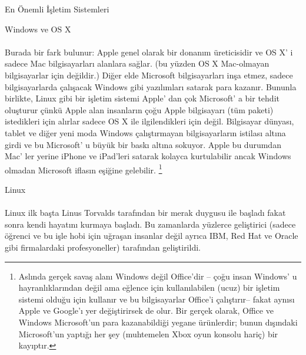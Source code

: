 \documentclass[10pt,a5paper]{book}
\begin{document}
\begin{section}{En Önemli İşletim Sistemleri}
\begin{subsection}{Windows ve OS X}
\paragraph{}{Burada bir fark bulunur: Apple genel olarak bir donanım üreticisidir ve OS X' i sadece Mac bilgisayarları alanlara sağlar. (bu yüzden OS X Mac-olmayan bilgisayarlar için değildir.) Diğer elde Microsoft bilgisayarları inşa etmez, sadece bilgisayarlarda çalışacak Windows gibi yazılımları satarak para kazanır. Bununla birlikte, Linux gibi bir işletim sistemi Apple' dan çok Microsoft' a bir tehdit oluşturur çünkü Apple alan insanların çoğu Apple bilgisayarı (tüm paketi) istedikleri için alırlar sadece OS X ile ilgilendikleri için değil. Bilgisayar dünyası, tablet ve diğer yeni moda Windows çalıştırmayan bilgisayarların istilası altına girdi ve bu Microsoft' u büyük bir baskı altına sokuyor. Apple bu durumdan Mac' ler yerine iPhone ve iPad'leri satarak kolayca kurtulabilir ancak Windows olmadan Microsoft iflasın eşiğine gelebilir.
\footnote{Aslında gerçek savaş alanı Windows değil Office'dir – çoğu insan Windows' u hayranlıklarından değil ama eğlence için kullanılabilen (ucuz) bir işletim sistemi olduğu için kullanır ve bu bilgisayarlar Office'i çalıştırır-- fakat aynısı Apple ve Google'ı yer değiştirirsek de olur. Bir gerçek olarak, Office ve Windows Microsoft'un para kazanabildiği yegane ürünlerdir; bunun dışındaki Microsoft'un yaptığı her şey (muhtemelen Xbox oyun konsolu hariç) bir kayıptır.}}
\end{subsection}
\begin{subsection}{Linux}
\paragraph{}{Linux ilk başta Linus Torvalds tarafından bir merak duygusu ile başladı fakat sonra kendi hayatını kurmaya başladı. Bu zamanlarda yüzlerce geliştirici (sadece öğrenci ve bu işle hobi için uğraşan insanlar değil ayrıca IBM, Red Hat ve Oracle gibi firmalardaki profesyoneller) tarafından geliştirildi.}

\end{subsection}
\end{section}
\end{document}
